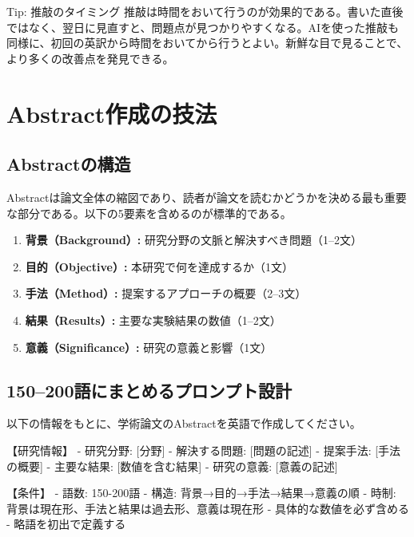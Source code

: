 \begin{itembox}[l]{Tip: 推敲のタイミング}
推敲は時間をおいて行うのが効果的である。書いた直後ではなく、翌日に見直すと、問題点が見つかりやすくなる。AIを使った推敲も同様に、初回の英訳から時間をおいてから行うとよい。新鮮な目で見ることで、より多くの改善点を発見できる。
\end{itembox}

\section{Abstract作成の技法}
\label{sec:4.5}

\subsection{Abstractの構造}

Abstractは論文全体の縮図であり、読者が論文を読むかどうかを決める最も重要な部分である。以下の5要素を含めるのが標準的である。

\begin{enumerate}
\item \textbf{背景（Background）:} 研究分野の文脈と解決すべき問題（1--2文）
\item \textbf{目的（Objective）:} 本研究で何を達成するか（1文）
\item \textbf{手法（Method）:} 提案するアプローチの概要（2--3文）
\item \textbf{結果（Results）:} 主要な実験結果の数値（1--2文）
\item \textbf{意義（Significance）:} 研究の意義と影響（1文）
\end{enumerate}

\subsection{150--200語にまとめるプロンプト設計}

\begin{promptbox}
以下の情報をもとに、学術論文のAbstractを英語で作成してください。

【研究情報】
- 研究分野: [分野]
- 解決する問題: [問題の記述]
- 提案手法: [手法の概要]
- 主要な結果: [数値を含む結果]
- 研究の意義: [意義の記述]

【条件】
- 語数: 150-200語
- 構造: 背景→目的→手法→結果→意義の順
- 時制: 背景は現在形、手法と結果は過去形、意義は現在形
- 具体的な数値を必ず含める
- 略語を初出で定義する
\end{promptbox}

